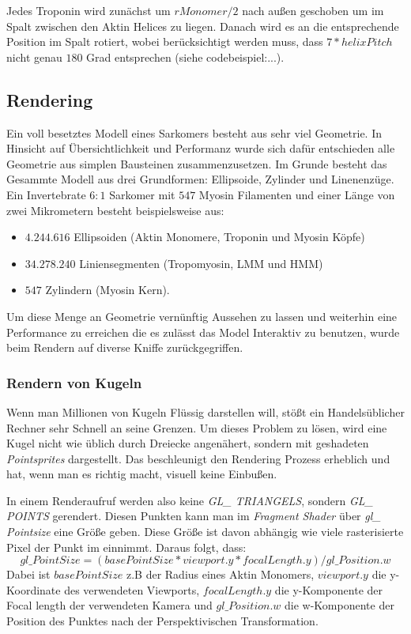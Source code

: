 \documentclass[a4paper,m]{cgBA}
\begin{document}
Jedes Troponin wird zunächst um \(rMonomer / 2\) nach außen geschoben um im Spalt zwischen den Aktin Helices zu liegen.
Danach wird es an die entsprechende Position im Spalt rotiert, wobei berücksichtigt werden muss, dass \(7 * helixPitch\) nicht genau \(180\) Grad entsprechen (siehe codebeispiel:...).

\subsection{Rendering}

Ein voll besetztes Modell eines Sarkomers besteht aus sehr viel Geometrie. In Hinsicht auf Übersichtlichkeit und Performanz wurde sich dafür entschieden alle Geometrie aus simplen Bausteinen zusammenzusetzen. Im Grunde besteht das Gesammte Modell aus drei Grundformen: Ellipsoide, Zylinder und Linenenzüge. Ein Invertebrate \(6:1\) Sarkomer mit \(547\) Myosin Filamenten und einer Länge von zwei Mikrometern besteht beispielsweise aus:
\begin{itemize}
\item  \(4.244.616\) Ellipsoiden (Aktin Monomere, Troponin und Myosin Köpfe)
\item  \(34.278.240\) Liniensegmenten (Tropomyosin, LMM und HMM)
\item \(547\) Zylindern (Myosin Kern).
\end{itemize}

Um diese Menge an Geometrie vernünftig Aussehen zu lassen und weiterhin eine Performance zu erreichen die es zulässt das Model Interaktiv zu benutzen, wurde beim Rendern auf diverse Kniffe zurückgegriffen.

\subsubsection{Rendern von Kugeln}
Wenn man Millionen von Kugeln Flüssig darstellen will, stößt ein Handelsüblicher Rechner sehr Schnell an seine Grenzen. Um dieses Problem zu lösen, wird eine Kugel nicht wie üblich durch Dreiecke angenähert, sondern mit geshadeten \textit{Pointsprites} dargestellt. Das beschleunigt den Rendering Prozess erheblich und hat, wenn man es richtig macht, visuell keine Einbußen.

In einem Renderaufruf werden also keine \textit{GL\_ TRIANGELS}, sondern \textit{GL\_ POINTS} gerendert. Diesen Punkten kann man im \textit{Fragment Shader} über \textit{gl\_ Pointsize} eine Größe geben. Diese Größe ist davon abhängig wie viele rasterisierte Pixel der Punkt im einnimmt. Daraus folgt, dass:
\begin{equation}
gl\_ PointSize = (basePointSize * viewport.y * focalLength.y) / gl\_ Position.w
\end{equation}
Dabei ist \(basePointSize\) z.B der Radius eines Aktin Monomers, \(viewport.y\) die y-Koordinate des verwendeten Viewports, \(focalLength.y\) die y-Komponente der Focal length der verwendeten Kamera und \(gl\_ Position.w\) die w-Komponente der Position des Punktes nach der Perspektivischen Transformation.
\end{document}
